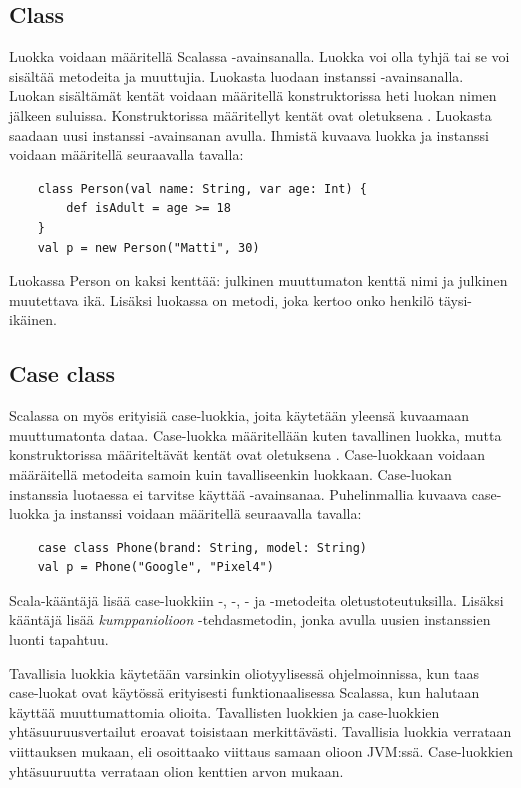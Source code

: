 \subsection{Class} \label{class}
Luokka voidaan määritellä Scalassa -avainsanalla. Luokka voi olla tyhjä tai se voi sisältää metodeita ja muuttujia. Luokasta luodaan instanssi -avainsanalla. Luokan sisältämät kentät voidaan määritellä konstruktorissa heti luokan nimen jälkeen suluissa. Konstruktorissa määritellyt kentät ovat oletuksena . Luokasta saadaan uusi instanssi -avainsanan avulla. Ihmistä kuvaava luokka ja instanssi voidaan määritellä seuraavalla tavalla:
\begin{lstlisting}
    class Person(val name: String, var age: Int) {
        def isAdult = age >= 18
    }
    val p = new Person("Matti", 30)
\end{lstlisting}
Luokassa Person on kaksi kenttää: julkinen muuttumaton kenttä nimi ja julkinen muutettava ikä. Lisäksi luokassa on metodi, joka kertoo onko henkilö täysi-ikäinen.
\cite[Classes]{tourOfScala}


\subsection{Case class} \label{caseclass}
Scalassa on myös erityisiä case-luokkia, joita käytetään yleensä kuvaamaan muuttumatonta dataa. Case-luokka määritellään kuten tavallinen luokka, mutta konstruktorissa määriteltävät kentät ovat oletuksena . Case-luokkaan voidaan määräitellä metodeita samoin kuin tavalliseenkin luokkaan. Case-luokan instanssia luotaessa ei tarvitse käyttää -avainsanaa. Puhelinmallia kuvaava case-luokka ja instanssi voidaan määritellä seuraavalla tavalla:
\begin{lstlisting}
    case class Phone(brand: String, model: String)
    val p = Phone("Google", "Pixel4")
\end{lstlisting}
Scala-kääntäjä lisää case-luokkiin -, -, - ja -metodeita oletustoteutuksilla. Lisäksi kääntäjä lisää \textit{kumppaniolioon} -tehdasmetodin, jonka avulla uusien instanssien luonti tapahtuu.
\cite[Luku 15]{prorgrammingInScala3rd}

Tavallisia luokkia käytetään varsinkin oliotyylisessä ohjelmoinnissa, kun taas case-luokat ovat käytössä erityisesti funktionaalisessa Scalassa, kun halutaan käyttää muuttumattomia olioita. Tavallisten luokkien ja case-luokkien yhtäsuuruusvertailut eroavat toisistaan merkittävästi. Tavallisia luokkia verrataan viittauksen mukaan, eli osoittaako viittaus samaan olioon JVM:ssä. Case-luokkien yhtäsuuruutta verrataan olion kenttien arvon mukaan.
\cite[Luku 15]{prorgrammingInScala3rd}

